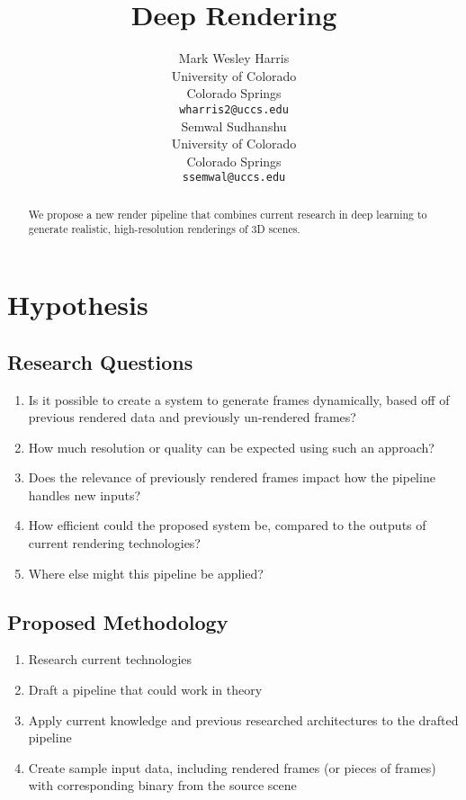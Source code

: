 \documentclass{article}
\title{Deep Rendering}
\author{Mark Wesley Harris\\
University of Colorado\\
Colorado Springs\\
\texttt{wharris2@uccs.edu} \\
\And
Semwal Sudhanshu\\
University of Colorado\\
Colorado Springs\\
\texttt{ssemwal@uccs.edu} \\
}
\begin{document}
\maketitle

\begin{abstract}
We propose a new render pipeline that combines current research in deep learning
to generate realistic, high-resolution renderings of 3D scenes.
\end{abstract}

\section{Hypothesis}
\label{sec:hypothesis}

\subsection{Research Questions}
\label{subsec:questions}
\begin{enumerate}
\item Is it possible to create a system to generate frames dynamically, based off of previous rendered data and previously un-rendered frames?
\item How much resolution or quality can be expected using such an approach?
\item Does the relevance of previously rendered frames impact how the pipeline handles new inputs?
\item How efficient could the proposed system be, compared to the outputs of current rendering technologies?
\item Where else might this pipeline be applied?
\end{enumerate}

\subsection{Proposed Methodology}
\label{subsec:methodology}
\begin{enumerate}
\item Research current technologies
\item Draft a pipeline that could work in theory
\item Apply current knowledge and previous researched architectures to the drafted pipeline
\item Create sample input data, including rendered frames (or pieces of frames) with corresponding binary from the source scene
\end{enumerate}
\end{document}
